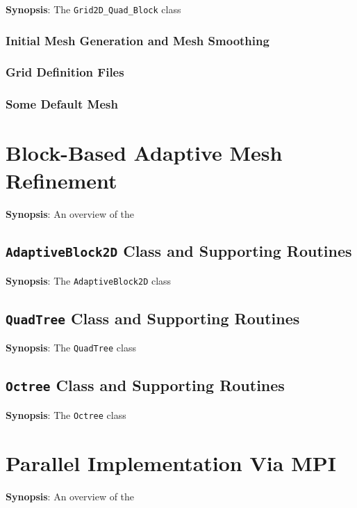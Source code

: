 \documentclass[11pt]{report}
\begin{document}
{\bf Synopsis}: The {\tt Grid2D\_Quad\_Block} class

\subsection{Initial Mesh Generation and Mesh Smoothing}

\subsection{Grid Definition Files}

\subsection{Some Default Mesh}

\chapter{Block-Based Adaptive Mesh Refinement}

{\bf Synopsis}: An overview of the 

\section{{\tt AdaptiveBlock2D} Class and Supporting Routines}

{\bf Synopsis}: The {\tt AdaptiveBlock2D} class

\section{{\tt QuadTree} Class and Supporting Routines}

{\bf Synopsis}: The {\tt QuadTree} class

\section{{\tt Octree} Class and Supporting Routines}

{\bf Synopsis}: The {\tt Octree} class

\chapter{Parallel Implementation Via MPI}

{\bf Synopsis}: An overview of the
\end{document}
